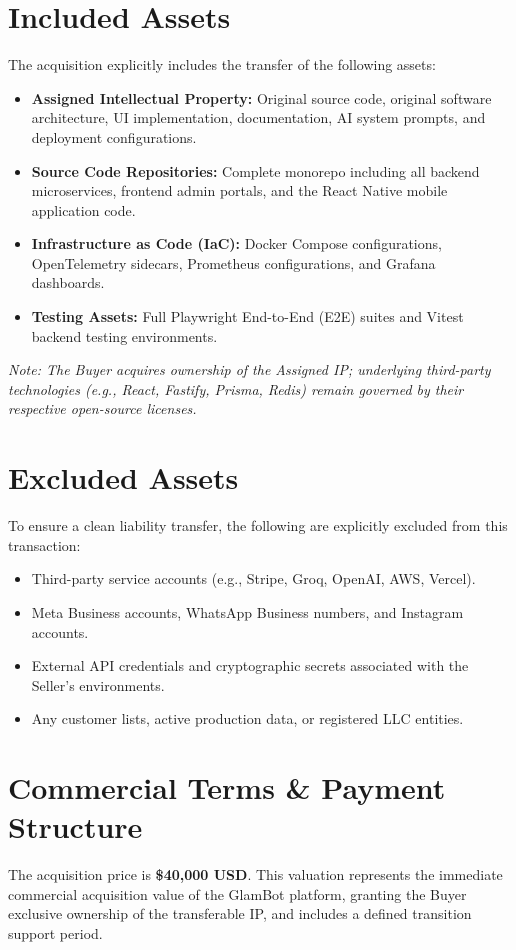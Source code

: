 \documentclass[11pt,a4paper]{report}
\begin{document}
\section{Included Assets}
The acquisition explicitly includes the transfer of the following assets:
\begin{itemize}
    \item \textbf{Assigned Intellectual Property:} Original source code, original software architecture, UI implementation, documentation, AI system prompts, and deployment configurations.
    \item \textbf{Source Code Repositories:} Complete monorepo including all backend microservices, frontend admin portals, and the React Native mobile application code.
    \item \textbf{Infrastructure as Code (IaC):} Docker Compose configurations, OpenTelemetry sidecars, Prometheus configurations, and Grafana dashboards.
    \item \textbf{Testing Assets:} Full Playwright End-to-End (E2E) suites and Vitest backend testing environments.
\end{itemize}
\textit{Note: The Buyer acquires ownership of the Assigned IP; underlying third-party technologies (e.g., React, Fastify, Prisma, Redis) remain governed by their respective open-source licenses.}

\section{Excluded Assets}
To ensure a clean liability transfer, the following are explicitly excluded from this transaction:
\begin{itemize}
    \item Third-party service accounts (e.g., Stripe, Groq, OpenAI, AWS, Vercel).
    \item Meta Business accounts, WhatsApp Business numbers, and Instagram accounts.
    \item External API credentials and cryptographic secrets associated with the Seller's environments.
    \item Any customer lists, active production data, or registered LLC entities.
\end{itemize}

\section{Commercial Terms \& Payment Structure}
The acquisition price is \textbf{\$40,000 USD}. This valuation represents the immediate commercial acquisition value of the GlamBot platform, granting the Buyer exclusive ownership of the transferable IP, and includes a defined transition support period.
\end{document}
